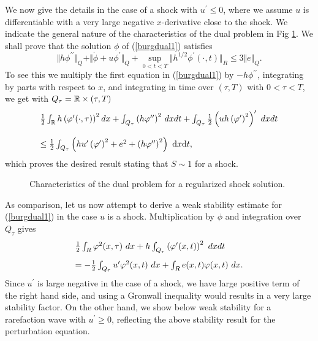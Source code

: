 We now give the details in the case of a shock with $u^\prime\le 0$, where
we assume $u$ is differentiable with a very large negative $x$-derivative
close to the shock.  We indicate the general nature of the characteristics of the dual problem 
in Fig \ref{chardualshock}.  
We shall prove that the solution $\phi$ of (\ref{burgdual1}) satisfies
\begin{equation}\label{strongstabest}
\Vert{h}\phi^{\prime\prime}\Vert_{Q}+
\Vert\dot\phi+u\phi^\prime\Vert_{Q}
+\sup_{0<t<T}\Vert{h}^{1/2}
\phi^\prime (\cdot , t)\Vert_{R}
\leq 3\Vert e\Vert_{Q}.
\end{equation}
To see this we multiply the first equation in (\ref{burgdual1}) by
$-h\phi^{\prime\prime}$, integrating by parts with respect to $x$, 
and integrating in time over $(\tau ,T)$ with $0<\tau <T$,
we get with $Q_{\tau} ={\mathbb{R}}\times (\tau ,T)$
\begin{equation}\begin{array}{l}
\frac{1}{2}\int_{\bbR}h\left(
\phi^\prime (\cdot ,\tau )\right)^2 dx 
+\int_{Q_{\tau}}\left(h\phi^{\prime\prime}\right)^2\,dxdt +\int_{Q_{\tau}}\frac{1}{2}
\left(uh\left(\phi^\prime\right)^2\right)^\prime ~dxdt  \vspace{4mm} \\
 \leq \frac{1}{2}\int_{Q_{\tau}}\left({h}u^\prime
\left(\phi^{\prime}\right)^2+e^2+\left(h\phi^{\prime\prime}\right)^2\right)~\mbox{d}x\mbox{d}t,
\end{array}
\end{equation}
which proves the desired result stating that $S\sim 1$ for a shock.

\begin{figure}[ht]\label{chardualshock}
\centerline{}
\caption{Characteristics of the dual problem for a 
regularized shock solution.}
\end{figure}


As comparison, let us now attempt to derive a weak stability  estimate 
for (\ref{burgdual1}) in the case $u$ is a shock.
Multiplication 
by $\phi$ and integration over $Q_\tau$ gives
\[
\begin{array}{l}
 \frac{1}{2}\int_R
\phi^2(x,\tau )~dx + h\int_{Q_\tau}\left(
\phi^\prime (x,t)\right)^2~dxdt \vspace{3mm}\\
= -\frac{1}{2}\int_{Q_\tau}u^\prime 
\phi^2(x,t)~dx +\int_{R}e(x,t) \phi(x,t)~dx .
\end{array}\]
Since $u^\prime$ is large negative in the case of a shock, we have
large positive term of the right hand side, and using a Gronwall
inequality would results in a very large stability
factor. On the other hand, we show below weak stability for a 
rarefaction wave with $u^\prime\ge 0$, reflecting the 
above stability result for the perturbation equation.



